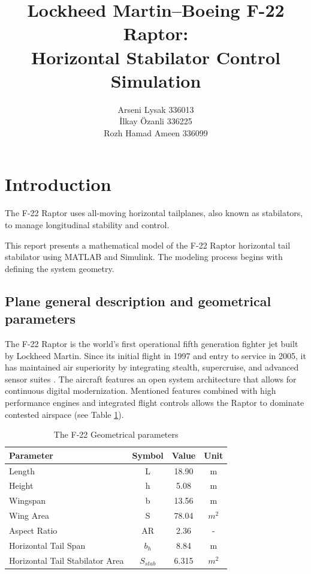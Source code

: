 \documentclass[
bindingoffset=5mm,  %
footnoteindent=3mm, %
hyphenation=true    %
]{src/wut-thesis}
\title{
	Lockheed Martin–Boeing F-22 Raptor: \\
	Horizontal Stabilator Control Simulation
	}
\author{Arseni Lysak 336013
	\\ İlkay Özanli 336225 \\ Rozh Hamad Ameen 336099}
\date{\the\year}
\begin{document}
	\maketitle
	
	\tableofcontents
	\newpage
	\section{Introduction}
		The F-22 Raptor uses all-moving horizontal tailplanes, also known as stabilators, to manage longitudinal stability and control. 
		
	    This report presents a mathematical model of the F-22 Raptor horizontal tail stabilator using MATLAB and Simulink. The modeling process begins with defining the system geometry.
	
	\subsection{Plane general description and geometrical parameters}
	
	The F-22 Raptor is the world's first operational  fifth generation fighter jet built by Lockheed Martin. Since its initial flight in 1997 and entry to service in 2005, it has maintained air superiority by integrating stealth, supercruise, and advanced sensor suites \cite{wiki:f22_raptor}.
	The aircraft features an open system architecture that allows for continuous digital modernization. Mentioned features combined with high performance engines and integrated flight controls allows the Raptor to dominate contested airspace \cite{lm:f22_product} (see Table \ref{table:data}). 
	
	\begin{table}[h!]
		\centering
		\begin{tabular}{l c c c} 
			\toprule
			Parameter & Symbol & Value & Unit \\ [0.5ex] 
			\midrule
			Length & L & 18.90 & m \\
			Height & h & 5.08 & m \\
			Wingspan & b & 13.56 & m\\
			Wing Area & S & 78.04 & $m^{2}$ \\
			Aspect Ratio & AR & 2.36 & -\\
			Horizontal Tail Span & $b_{h}$ & 8.84 & m\\ 
			Horizontal Tail Stabilator Area & $S_{stab}$ & 6.315 & $m^{2}$\\ [1ex] 
			\bottomrule
		\end{tabular}
		\caption[The F-22 Geometrical parameters]{The F-22 Geometrical parameters \cite{wiki:f22_raptor, lm:f22_card}}
		\label{table:data}
	\end{table}
	
\end{document}
